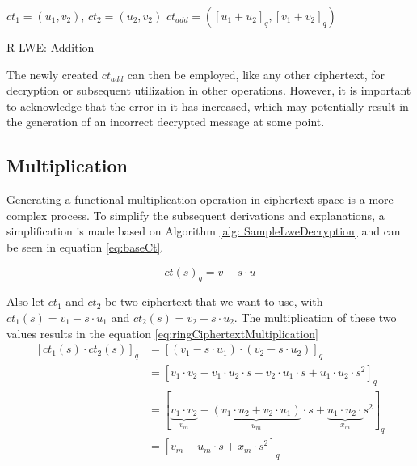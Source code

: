 \begin{algorithm}[htb]
  \begin{algorithmic}[1]
    \REQUIRE $ct_1 = (u_1, v_2)$, $ct_2 = (u_2, v_2)$
    \RETURN $ct_{add} = ([u_1 + u_2]_q, [v_1 + v_2]_q)$
  \end{algorithmic}
  \caption{R-LWE: Addition}
  \label{alg:RlweAddition}
\end{algorithm}

The newly created $ct_{add}$ can then be employed, like any other ciphertext, for decryption or subsequent utilization in other operations. However, it is important to acknowledge that the error in it has increased, which may potentially result in the generation of an incorrect decrypted message at some point.

\subsection*{Multiplication}

Generating a functional multiplication operation in ciphertext space is a more complex process. To simplify the subsequent derivations and explanations, a simplification is made based on Algorithm \ref{alg: SampleLweDecryption} and can be seen in equation \ref{eq:baseCt}.

\begin{equation}
  ct(s)_q = v-s\cdot u
  \label{eq:baseCt}
\end{equation}

Also let $ct_1$ and $ct_2$ be two ciphertext that we want to use, with $ct_1(s) = v_1-s\cdot u_1$ and $ct_2(s) = v_2-s\cdot u_2$. The multiplication of these two values results in the equation \ref{eq:ringCiphertextMultiplication}
\begin{equation}
  \begin{split}
    [ct_1(s)\cdot ct_2(s)]_q & = [(v_1-s\cdot u_1) \cdot (v_2-s\cdot u_2)]_q                                                                                              \\
                             & = [v_1\cdot v_2 - v_1\cdot u_2 \cdot s- v_2\cdot u_1\cdot s + u_1\cdot u_2\cdot s^2]_q                                                     \\
                             & = [\underbrace{v_1\cdot v_2}_{v_m} - \underbrace{(v_1\cdot u_2 + v_2\cdot u_1)}_{u_m}\cdot s + \underbrace{u_1\cdot u_2\cdot}_{x_m} s^2]_q \\
                             & = [v_m - u_m\cdot s + x_m \cdot s^2]_q
  \end{split}
  \label{eq:ringCiphertextMultiplication}
\end{equation}

